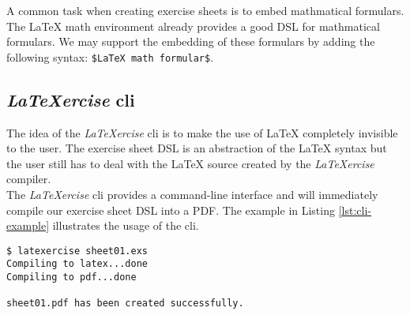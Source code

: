 \documentclass[12pt,letterpaper, onecolumn]{article}
\begin{document}
A common task when creating exercise sheets is to embed mathmatical formulars. The \LaTeX{} math environment already provides a good DSL for mathmatical formulars. We may support the embedding of these formulars by adding the following syntax: \texttt{\$\LaTeX{} math formular\$}.\\

\subsection{\emph{LaTeXercise} cli}

The idea of the \emph{LaTeXercise} cli is to make the use of \LaTeX{} completely invisible to the user. The exercise sheet DSL is an abstraction of the \LaTeX{} syntax but the user still has to deal with the \LaTeX{} source created by the \emph{LaTeXercise} compiler.\\

The \emph{LaTeXercise} cli provides a command-line interface and will immediately compile our exercise sheet DSL into a PDF. The example in Listing \ref{lst:cli-example} illustrates the usage of the cli.

\begin{center}
\begin{minipage}{0.6\textwidth}
\begin{lstlisting}[caption={Example usage of the \emph{LaTeXercise} cli}, label=lst:cli-example]
$ latexercise sheet01.exs
Compiling to latex...done
Compiling to pdf...done

sheet01.pdf has been created successfully.
\end{lstlisting}
\end{minipage}
\end{center}
\end{document}
